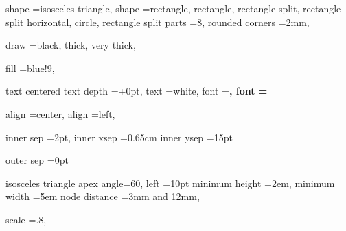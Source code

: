 shape                        =isosceles triangle,
shape                        =rectangle,
rectangle,
rectangle split,
rectangle split horizontal,
circle,
rectangle split parts        =8,
rounded corners              =2mm,

draw                         =black,
thick, 
very thick,

fill                         =blue!9,


text centered
text depth                   =+0pt,
text                         =white,
font                         =\bf,
font                         =\Large




align                        =center,
align                        =left,





inner sep                    =2pt,
inner xsep                   =0.65cm
inner ysep                   =15pt

outer sep                    =0pt



isosceles triangle apex angle=60,
left                         =10pt
minimum height               =2em,
minimum width                =5em
node distance                =3mm and 12mm,


scale                        =.8,













